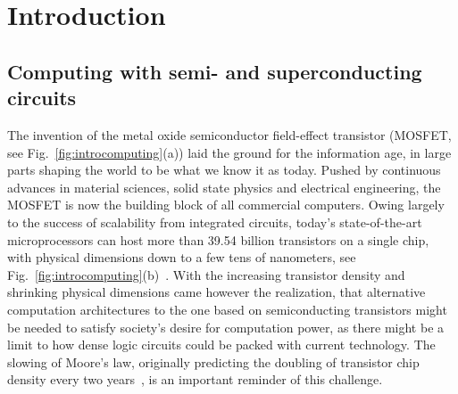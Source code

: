 \newchapstyle
\chapter{Introduction}
\label{chap:intro}



\afterpage{\pagecolor{none}}\newpage

\section{Computing with semi- and superconducting circuits}

The invention of the metal oxide semiconductor field-effect transistor (MOSFET, see Fig.~\ref{fig:introcomputing}(a)) laid the ground for the information age, in large parts shaping the world to be what we know it as today.
%
Pushed by continuous advances in material sciences, solid state physics and electrical engineering, the MOSFET is now the building block of all commercial computers.
%
Owing largely to the success of scalability from integrated circuits, today's state-of-the-art microprocessors can host more than 39.54 billion transistors on a single chip, with physical dimensions down to a few tens of nanometers, see Fig.~\ref{fig:introcomputing}(b)~\cite{mujtabaAMDEPYCRome2019}.
%
With the increasing transistor density and shrinking physical dimensions came however the realization, that alternative computation architectures to the one based on semiconducting transistors might be needed to satisfy society's desire for computation power, as there might be a limit to how dense logic circuits could be packed with current technology.
%
The slowing of Moore's law, originally predicting the doubling of transistor chip density every two years~\cite{mooreCrammingMoreComponents2006}, is an important reminder of this challenge.


